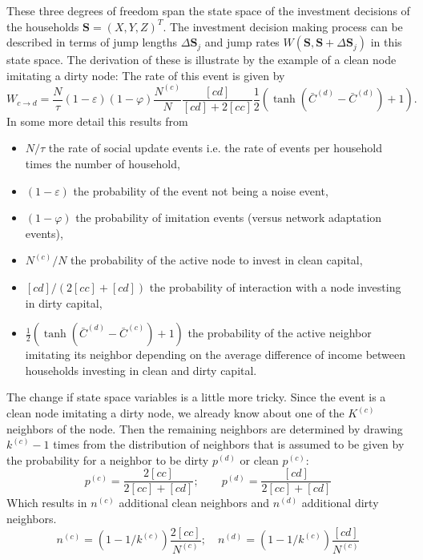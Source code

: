 These three degrees of freedom span the state space of the investment decisions of the households $\mathbf{S} = (X, Y, Z)^T$. The investment decision making process can be described in terms of jump lengths $\Delta \mathbf{S}_j$ and jump rates $W(\mathbf{S},\mathbf{S} + \Delta \mathbf{S}_j)$ in this state space.
The derivation of these is illustrate by the example of a clean node imitating a dirty node: The rate of this event is given by
\begin{equation}
	W_{c \rightarrow d} = \frac{N}{\tau} (1-\varepsilon) (1 - \varphi) \frac{N^{(c)}}{N}\frac{[cd]}{[cd] + 2 [cc]}\frac{1}{2}\left( \tanh(\bar{C}^{(d)} - \bar{C}^{(d)}) + 1 \right).
	\label{cdswitchingprob}
\end{equation}
In some more detail this results from
\begin{itemize}
	\item $N/\tau$ the rate of social update events i.e. the rate of events per household times the number of household,
	\item $(1-\varepsilon)$ the probability of the event not being a noise event,
	\item $(1-\varphi)$ the probability of imitation events (versus network adaptation events),
	\item $N^{(c)}/N$ the probability of the active node to invest in clean capital,
	\item $[cd]/(2[cc] + [cd])$ the probability of interaction with a node investing in dirty capital,
	\item $\frac{1}{2}\left( \tanh(\bar{C}^{(d)} - \bar{C}^{(c)}) + 1 \right)$ the probability of the active neighbor imitating its neighbor depending on the average difference of income between households investing in clean and dirty capital.
\end{itemize}
The change if state space variables is a little more tricky. Since the event is a clean node imitating a dirty node, we already know about one of the $K^{(c)}$ neighbors of the node. Then the remaining neighbors are determined by drawing $k^{(c)} - 1$ times from the distribution of neighbors that is assumed to be given by the probability for a neighbor to be dirty $p^{(d)}$ or clean $p^{(c)}$:
\begin{equation}
	p^{(c)} = \frac{2 [cc]}{2[cc] + [cd]}; \qquad p^{(d)} = \frac{[cd]}{2[cc] + [cd]}
	\label{neighbordist}
\end{equation}
Which results in $n^{(c)}$ additional clean neighbors and $n^{(d)}$ additional dirty neighbors.
\begin{equation}
	n^{(c)} = (1-1/k^{(c)})\frac{2[cc]}{N^{(c)}}; \quad n^{(d)} = (1-1/k^{(c)})\frac{[cd]}{N^{(c)}}
	\label{additional_neighbors}
\end{equation}
